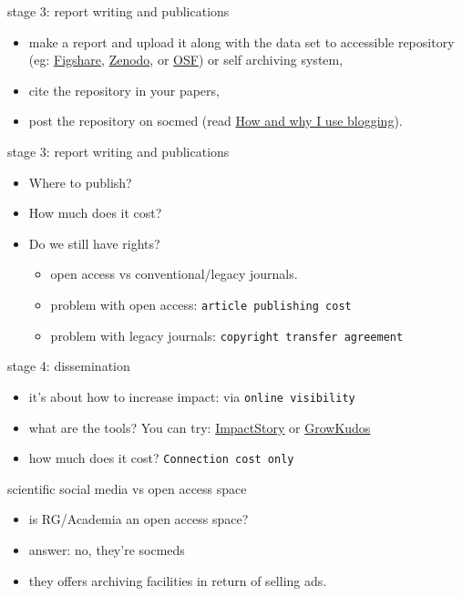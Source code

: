 \documentclass[10pt]{beamer}
\begin{document}
\begin{frame}{stage 3: report writing and publications}
   \begin{itemize}
   \item make a report and upload it along with the data set to accessible repository (eg: 
   \href{www.figshare.com}{Figshare},
   \href{www.zenodo.org}{Zenodo}, or 
   \href{http://osf.io}{OSF}) or self archiving system,    
   \item cite the repository in your papers,
   \item post the repository on socmed (read \href{http://www.slideshare.net/flxlex/how-and-why-i-use-blogging?qid=19764e8a-1bdc-4878-b275-497c85cd664f&v=&b=&from_search=7}{How and why I use blogging}).
  \end{itemize}
\end{frame}
  
\begin{frame}{stage 3: report writing and publications}
   \begin{itemize}
   \item Where to publish?
   \item How much does it cost?
   \item Do we still have rights?
   		\begin{itemize}
  		\item open access vs conventional/legacy journals. 
    	\item problem with open access: \texttt{article publishing cost}
    	\item problem with legacy journals: \texttt{copyright transfer agreement}
  		\end{itemize}
  \end{itemize}
\end{frame}
  
\begin{frame}{stage 4: dissemination}
  \begin{itemize}
  	\item it's about how to increase impact: via \texttt{online visibility}
    \item what are the tools? You can try: \href{www.impactstory.org}{ImpactStory} or \href{www.growkudos.com}{GrowKudos} 
    \item how much does it cost? \texttt{Connection cost only}
  \end{itemize}
\end{frame}
  

\begin{frame}{scientific social media vs open access space}
  \begin{itemize}
  	\item is RG/Academia an open access space?
    \item answer: no, they're socmeds
    \item they offers archiving facilities in return of selling ads.
  \end{itemize}
\end{frame}
  
\end{document}
